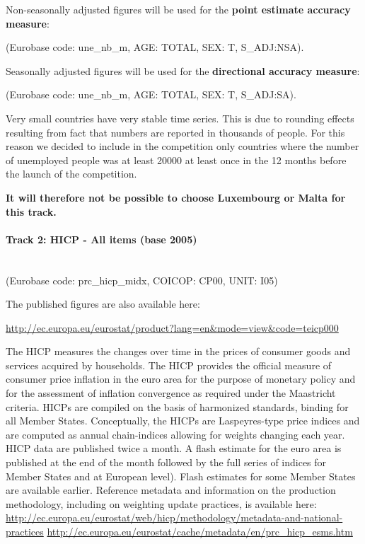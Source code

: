 \documentclass[12pt]{article}
\begin{document}
Non-seasonally adjusted figures will be used for the \textbf{point estimate accuracy measure}:

(Eurobase code: une\_nb\_m, AGE: TOTAL, SEX: T, S\_ADJ:NSA).

Seasonally adjusted figures will be used for the \textbf{directional accuracy measure}: 

(Eurobase code: une\_nb\_m, AGE: TOTAL, SEX: T, S\_ADJ:SA).

Very small countries have very stable time series. This is due to rounding effects resulting from fact that numbers are reported in thousands of people. For this reason we decided to include in the competition only countries where the number of unemployed people was at least 20000 at least once in the 12 months before the launch of the competition.

\textbf{It will therefore not be possible to choose Luxembourg or Malta for this track.}

\paragraph{Track 2:  HICP - All items (base 2005)}
\label{track_hicp_cp00}
\textbf{ }\\
(Eurobase code: prc\_hicp\_midx, COICOP: CP00, UNIT: I05)

The published figures are also available here:

\url{http://ec.europa.eu/eurostat/product?lang=en&mode=view&code=teicp000}

The HICP measures the changes over time in the prices of consumer goods and services acquired by households. The HICP provides the official measure of consumer price inflation in the euro area for the purpose of monetary policy and for the assessment of inflation convergence as required under the Maastricht criteria. HICPs are compiled on the basis of harmonized standards, binding for all Member States. Conceptually, the HICPs are Laspeyres-type price indices and are computed as annual chain-indices allowing for weights changing each year. HICP data are published twice a month. A flash estimate for the euro area is published at the end of the month followed by the full series of indices for Member States and at European level). Flash estimates for some Member States are available earlier.
Reference metadata and information on the production methodology, including on weighting update practices, is available here:
\sloppy
\newline
\url{http://ec.europa.eu/eurostat/web/hicp/methodology/metadata-and-national-practices}
\newline
\url{http://ec.europa.eu/eurostat/cache/metadata/en/prc_hicp_esms.htm}
\end{document}

